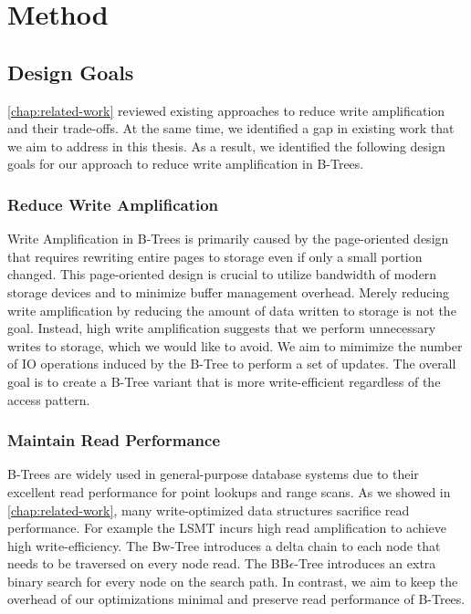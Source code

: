 \chapter{Method}
\label{chap:method}

\section{Design Goals}
\autoref{chap:related-work} reviewed existing approaches to reduce write amplification and their trade-offs.
At the same time, we identified a gap in existing work that we aim to address in this thesis.
As a result, we identified the following design goals for our approach to reduce write amplification in B-Trees.

\subsection*{Reduce Write Amplification}
Write Amplification in B-Trees is primarily caused by the page-oriented design that requires rewriting entire pages to storage even if only a small portion changed.
This page-oriented design is crucial to utilize bandwidth of modern storage devices and to minimize buffer management overhead.
Merely reducing write amplification by reducing the amount of data written to storage is not the goal.
Instead, high write amplification suggests that we perform unnecessary writes to storage, which we would like to avoid.
We aim to mimimize the number of \ac{IO} operations induced by the B-Tree to perform a set of updates.
The overall goal is to create a B-Tree variant that is more write-efficient regardless of the access pattern.

\subsection*{Maintain Read Performance}
B-Trees are widely used in general-purpose database systems due to their excellent read performance for point lookups and range scans.
As we showed in \autoref{chap:related-work}, many write-optimized data structures sacrifice read performance.
For example the \ac{LSMT} incurs high read amplification to achieve high write-efficiency. 
The Bw-Tree introduces a delta chain to each node that needs to be traversed on every node read.
The BB$\epsilon$-Tree introduces an extra binary search for every node on the search path.
In contrast, we aim to keep the overhead of our optimizations minimal and preserve read performance of B-Trees.

